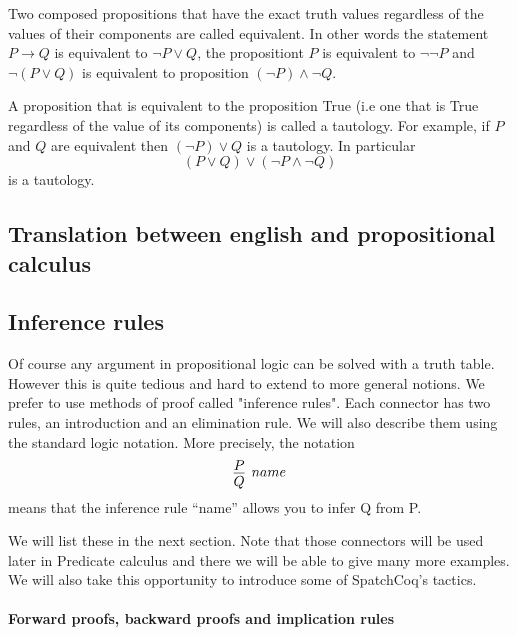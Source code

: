 \begin{itemize}
Two composed propositions that have the exact truth values regardless of the values of their components are called equivalent. In other words the statement $P \rightarrow Q$ is equivalent to $\neg P \lor Q$, the propositiont $P$ is equivalent to  $\neg \neg P$ and  $ \neg ( P \lor Q)$ is equivalent to proposition $(\neg P)\land \neg Q $.

A proposition that is equivalent to the proposition True (i.e one that is True regardless of the value of its components) is called a tautology. For example, if $P$ and $Q$ are equivalent then $(\neg P) \lor Q$ is a tautology. In particular  $$ ( P \lor Q) \lor (\neg P\land \neg Q)$$ is a tautology. 

\subsection{Translation between english and propositional calculus}

\subsection{Inference rules}\label{subset:inference}

Of course any argument in propositional logic can be solved with a truth table. However this is quite tedious and hard to extend to more general notions. We prefer to use methods of proof called "inference rules".
Each connector has two rules, an introduction and an elimination rule. We will also describe them using the standard logic notation. More precisely, the notation
$$\infer[name]{Q}{P}$$
means that the inference rule ``name'' allows you to infer Q from P.



 
 

 We will list these in the next section. Note that those connectors will be used later in Predicate calculus and there we will be able to give many more examples. We will also take this opportunity to introduce some of SpatchCoq's tactics.

\paragraph{\bf Forward proofs, backward proofs and implication rules}


\end{itemize}
